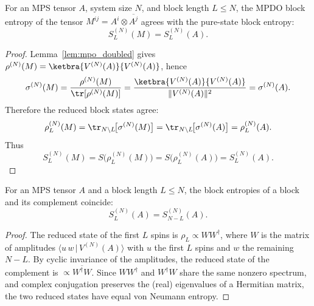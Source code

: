 \begin{lemma}
    \label{lem:blockEntropy_doubledTensor}
    \leanok
    For an MPS tensor $A$, system size $N$, and block length $L \le N$, the MPDO
    block entropy of the tensor $M^{ij} = A^i \otimes \overline{A^j}$ agrees
    with the pure-state block entropy:
    \[
        S_L^{(N)}(M) = S_L^{(N)}(A).
    \]
\end{lemma}
\begin{proof}\leanok
    Lemma~\ref{lem:mpo_doubled} gives
    $\rho^{(N)}(M) = \ketbra{V^{(N)}(A)}{V^{(N)}(A)}$, hence
    \[
        \sigma^{(N)}(M)
        =
        \frac{\rho^{(N)}(M)}{\tr[\rho^{(N)}(M)]}
        =
        \frac{\ketbra{V^{(N)}(A)}{V^{(N)}(A)}}{\|V^{(N)}(A)\|^2}
        =
        \sigma^{(N)}(A).
    \]
    Therefore the reduced block states agree:
    \[
        \rho_L^{(N)}(M)
        =
        \tr_{N\setminus L}\!\bigl[\sigma^{(N)}(M)\bigr]
        =
        \tr_{N\setminus L}\!\bigl[\sigma^{(N)}(A)\bigr]
        =
        \rho_L^{(N)}(A).
    \]
    Thus
    \[
        S_L^{(N)}(M)
        =
        S\bigl(\rho_L^{(N)}(M)\bigr)
        =
        S\bigl(\rho_L^{(N)}(A)\bigr)
        =
        S_L^{(N)}(A).
    \]
\end{proof}

\begin{lemma}\label{lem:schmidt_symmetry}
    \leanok
    For an MPS tensor $A$ and a block length $L\le N$, the block entropies of a
    block and its complement coincide:
    \[
        S_L^{(N)}(A) = S_{N-L}^{(N)}(A).
    \]
\end{lemma}
\begin{proof}\leanok
    The reduced state of the first $L$ spins is $\rho_L \propto W W^\dagger$, where
    $W$ is the matrix of amplitudes $\langle u\,w\,|\,V^{(N)}(A)\rangle$ with $u$ the
    first $L$ spins and $w$ the remaining $N-L$. By cyclic invariance of the
    amplitudes, the reduced state of the complement is $\propto \overline{W^\dagger W}$.
    Since $W W^\dagger$ and $W^\dagger W$ share the same nonzero spectrum, and
    complex conjugation preserves the (real) eigenvalues of a Hermitian matrix, the
    two reduced states have equal von Neumann entropy.
\end{proof}

